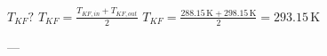 \( T_{KF}? \)  
\( T_{KF} = \frac{T_{KF,in} + T_{KF,out}}{2} \)  
\( T_{KF} = \frac{288.15 \, \text{K} + 298.15 \, \text{K}}{2} = 293.15 \, \text{K} \)  

---